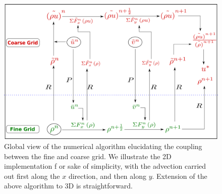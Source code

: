 \begin{figure}[ht]
    \centering
    \includegraphics[width = \textwidth]{plots/momcons_sagar.png}
    \caption{Global view of the numerical algorithm elucidating the coupling between 
	the fine and coarse grid. We illustrate the 2D implementation f
	or sake of simplicity, with the advection carried out first along 
	the $x$ direction, and then along $y$. 
	Extension of the above algorithm to 3D is straightforward.}
    \label{momcons_sagar}
\end{figure}



